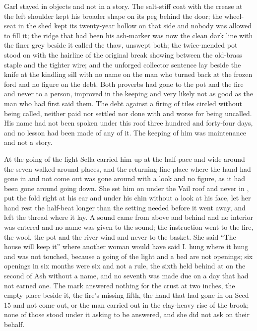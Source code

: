 Garl stayed in objects and not in a story. The salt-stiff coat with the crease at the left shoulder kept his broader shape on its peg behind the door; the wheel-seat in the shed kept its twenty-year hollow on that side and nobody was allowed to fill it; the ridge that had been his ash-marker was now the clean dark line with the finer grey beside it called the thaw, unswept both; the twice-mended pot stood on  with the hairline of the original break showing between the old-brass staple and the tighter wire; and the unforged collector sentence lay beside the knife at the kindling sill with no name on the man who turned back at the frozen ford and no figure on the debt. Both proverbs had gone to the pot and the fire and never to a person, improved in the keeping and very likely not as good as the man who had first said them. The debt against a firing of tiles circled without being called, neither paid nor settled nor done with and worse for being uncalled. His name had not been spoken under this roof three hundred and forty-four days, and no lesson had been made of any of it. The keeping of him was maintenance and not a story.

\scenebreak

At the going of the light Sella carried him up at the half-pace and wide around the seven walked-around places, and the returning-line place where the hand had gone in and not come out was gone around with a look and no figure, as it had been gone around going down. She set him on  under the Vail roof and never in , put the fold right at his ear and under his chin without a look at his face, let her hand rest the half-beat longer than the setting needed before it went away, and left the thread where it lay. A sound came from above and behind and no interior was entered and no name was given to the sound; the instruction went to the fire, the wool, the pot and the river wind and never to the basket. She said “The house will keep it” where another woman would have said I.  hung where it hung and was not touched, because a going of the light and a bed are not openings; six openings in six months were six and not a rule, the sixth held behind at  on the second of Ash without a name, and no seventh was made due on a day that had not earned one. The mark answered nothing for the crust at two inches, the empty place beside it, the fire's missing fifth, the hand that had gone in on Seed 15 and not come out, or the man carried out in the clay-heavy rise of the brook; none of those stood under it asking to be answered, and she did not ask on their behalf.

